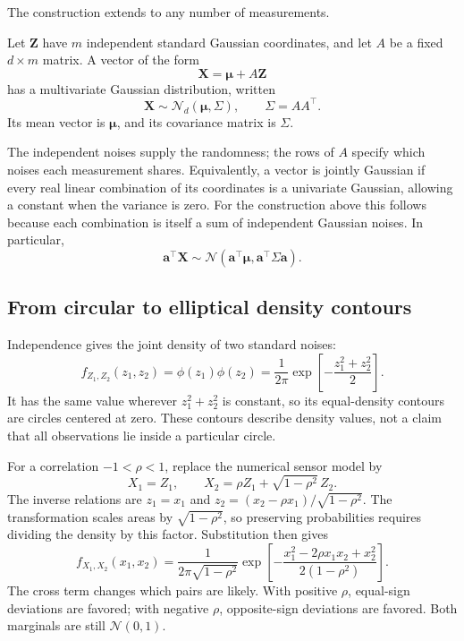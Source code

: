 The construction extends to any number of measurements.

\begin{definition}
Let \(\mathbf Z\) have \(m\) independent standard Gaussian coordinates,
and let \(A\) be a fixed \(d\times m\) matrix. A vector of the form
\[
  \mathbf X=\boldsymbol\mu+A\mathbf Z
\]
has a multivariate Gaussian distribution, written
\[
  \mathbf X\sim\mathcal N_d(\boldsymbol\mu,\Sigma),
  \qquad \Sigma=AA^\top.
\]
Its mean vector is \(\boldsymbol\mu\), and its covariance matrix is
\(\Sigma\).
\end{definition}

The independent noises supply the randomness; the rows of \(A\) specify
which noises each measurement shares. Equivalently, a vector is jointly
Gaussian if every real linear combination of its coordinates is a
univariate Gaussian, allowing a constant when the variance is zero.
For the construction above this follows because each combination is
itself a sum of independent Gaussian noises. In particular,
\begin{equation}
  \mathbf a^\top\mathbf X
  \sim\mathcal N(\mathbf a^\top\boldsymbol\mu,
                 \mathbf a^\top\Sigma\mathbf a).
  \label{eq:gaussian-linear-combination}
\end{equation}

\subsection{From circular to elliptical density contours}

Independence gives the joint density of two standard noises:
\[
  f_{Z_1,Z_2}(z_1,z_2)
  =\phi(z_1)\phi(z_2)
  =\frac1{2\pi}\exp\!\left[-\frac{z_1^2+z_2^2}{2}\right].
\]
It has the same value wherever \(z_1^2+z_2^2\) is constant, so its
equal-density contours are circles centered at zero. These contours
describe density values, not a claim that all observations lie inside
a particular circle.

For a correlation \(-1<\rho<1\), replace the numerical sensor model by
\[
  X_1=Z_1,\qquad X_2=\rho Z_1+\sqrt{1-\rho^2}\,Z_2.
\]
The inverse relations are
\(z_1=x_1\) and
\(z_2=(x_2-\rho x_1)/\sqrt{1-\rho^2}\).
The transformation scales areas by \(\sqrt{1-\rho^2}\), so preserving
probabilities requires dividing the density by this factor. Substitution
then gives
\begin{equation}
  f_{X_1,X_2}(x_1,x_2)
  =\frac1{2\pi\sqrt{1-\rho^2}}
    \exp\!\left[-\frac{x_1^2-2\rho x_1x_2+x_2^2}
                         {2(1-\rho^2)}\right].
  \label{eq:bivariate-standard-density}
\end{equation}
The cross term changes which pairs are likely. With positive \(\rho\),
equal-sign deviations are favored; with negative \(\rho\), opposite-sign
deviations are favored. Both marginals are still \(\mathcal N(0,1)\).


